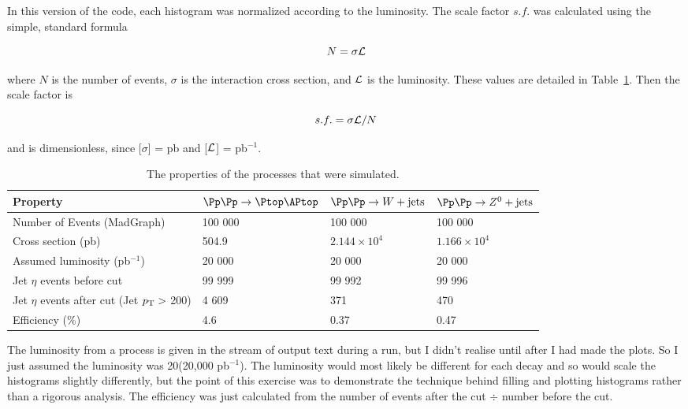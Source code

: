 In this version of the code, each histogram was normalized according to the luminosity. The scale factor $s.f.$ was calculated using the simple, standard formula

\begin{equation}
\label{eq:lumiexpev}
N = \sigma \mathcal{L}
\end{equation}

where $N$ is the number of events, $\sigma$ is the interaction cross section, and $\mathcal{L}$ is the luminosity. These values are detailed in Table~\ref{tab:comparison}. Then the scale factor is

\begin{equation}
s.f. = \sigma \mathcal{L} / N
\end{equation}

and is dimensionless, since [$\sigma$] = pb and [$\mathcal{L}$] = pb$^{-1}$.

\begin{table}[htbp]
\centering
    \begin{tabular}{|l|l|l|l|}
    \hline
    Property                                & $\Pp\Pp \rightarrow \ttbar$ & $\Pp\Pp \rightarrow W + \mathrm{jets}$ & $\Pp\Pp \rightarrow Z^0 + \mathrm{jets}$ \\ \hline
    Number of Events (MadGraph)             & 100 000 & 100 000 & 100 000 \\
    Cross section (pb)                      & 504.9   & $2.144\times10^4$ & $1.166\times10^4$ \\
    Assumed luminosity (pb$^{-1}$)		& 20 000	& 20 000 & 20 000 \\
    Jet $\eta$ events before cut               & 99 999  & 99 992  & 99 996  \\
    Jet $\eta$  events after cut (Jet $p_{\mathrm{T}} >$ 200) & 4 609    & 371     & 470     \\
    Efficiency (\%)                         & 4.6     & 0.37    & 0.47    \\ \hline
    \end{tabular}
\caption{The properties of the \madgraph processes that were simulated.}
\label{tab:comparison}
\end{table}

The luminosity from a process is given in the stream of output text during a \madgraph run, but I didn't realise until after I had made the plots. So I just assumed the luminosity was 20\fbinv (20,000 pb$^{-1}$). The luminosity would most likely be different for each decay and so would scale the histograms slightly differently, but the point of this exercise was to demonstrate the technique behind filling and plotting histograms rather than a rigorous analysis. The efficiency was just calculated from the number of events after the cut $\div$ number before the cut.

